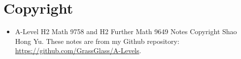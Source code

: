 \section*{Copyright}
\begin{itemize}
    \item A-Level H2 Math 9758 and H2 Further Math 9649 Notes Copyright  Shao Hong Yu. These notes are from my Github repository: \url{https://github.com/GrassGlass/A-Levels}.









\end{itemize}
